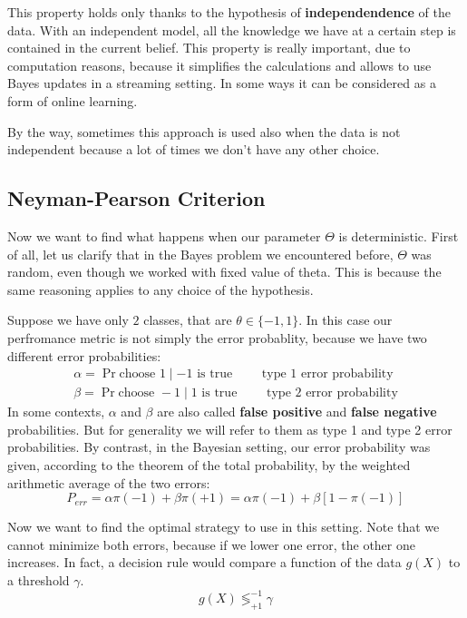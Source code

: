 This property holds only thanks to the hypothesis of \textbf{independendence} of the data. With an independent model, all the knowledge we have at a certain step is contained in the current belief. This property is really important, due to computation reasons, because it simplifies the calculations and allows to use Bayes updates in a streaming setting. In some ways it can be considered as a form of online learning.

By the way, sometimes this approach is used also when the data is not independent because a lot of times we don't have any other choice. 
\subsection{Neyman-Pearson Criterion}
Now we want to find what happens when our parameter $\Theta$ is deterministic. First of all, let us clarify that in the Bayes problem we encountered before, $\Theta$ was random, even though we worked with fixed value of theta. This is because the same reasoning applies to any choice of the hypothesis.

Suppose we have only $2$ classes, that are $\theta \in \{-1, 1\}$. In this case our perfromance metric is not simply the error probablity, because we have two different error probabilities:
\begin{gather*}
    \alpha = \Pr{\text{choose } 1 \mid -1\text{ is true}} \qquad \text{ type 1 error probability} \\
    \beta = \Pr{\text{choose } -1 \mid 1\text{ is true}} \qquad \text{ type 2 error probability}
\end{gather*}
In some contexts, $\alpha$ and $\beta$ are also called \textbf{false positive} and \textbf{false negative} probabilities. But for generality we will refer to them as type 1 and type 2 error probabilities.
By contrast, in the Bayesian setting, our error probability was given, according to the theorem of the total probability, by the weighted arithmetic average of the two errors:
\[
    P_{err} = \alpha \pi(-1) + \beta \pi(+1) = \alpha \pi(-1) + \beta [1-\pi(-1)]
\]

Now we want to find the optimal strategy to use in this setting. Note that we cannot minimize both errors, because if we lower one error, the other one increases. 
In fact, a decision rule would compare a function of the data $g(X)$ to a threshold $\gamma$. 
\[
    g(X) \lessgtr^{-1}_{+1} \gamma
\]

